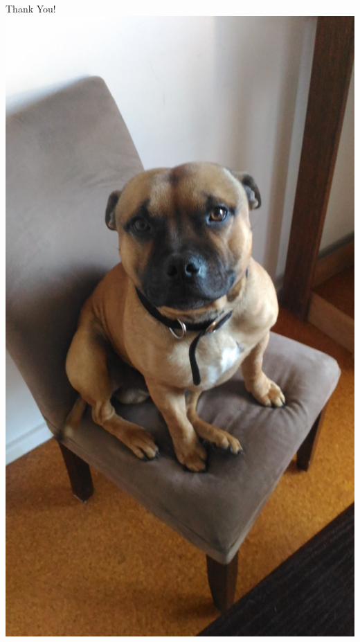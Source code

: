 \documentclass{beamer}
\begin{document}
\begin{frame}
\begin{center}
{\fontsize{40}{50}\selectfont Thank You!}
{\includegraphics[scale=0.05]{turbo.jpg}}
\end{center}
\end{frame}
\end{document}
